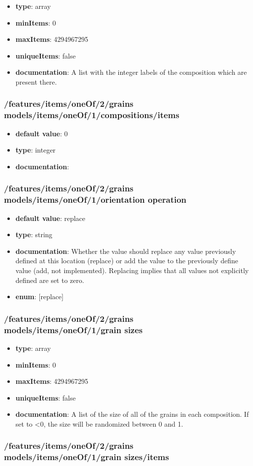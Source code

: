 \begin{itemize}\item {\bf type}: array
\item {\bf minItems}: 0
\item {\bf maxItems}: 4294967295
\item {\bf uniqueItems}: false
\item {\bf documentation}: A list with the integer labels of the composition which are present there.
\end{itemize}\subsubsection{/features/items/oneOf/2/grains models/items/oneOf/1/compositions/items}
\begin{itemize}\item {\bf default value}: 0
\item {\bf type}: integer
\item {\bf documentation}: 
\end{itemize}\subsubsection{/features/items/oneOf/2/grains models/items/oneOf/1/orientation operation}
\begin{itemize}\item {\bf default value}: replace
\item {\bf type}: string
\item {\bf documentation}: Whether the value should replace any value previously defined at this location (replace) or add the value to the previously define value (add, not implemented). Replacing implies that all values not explicitly defined are set to zero.
\item {\bf enum}: [replace]\end{itemize}\subsubsection{/features/items/oneOf/2/grains models/items/oneOf/1/grain sizes}
\begin{itemize}\item {\bf type}: array
\item {\bf minItems}: 0
\item {\bf maxItems}: 4294967295
\item {\bf uniqueItems}: false
\item {\bf documentation}: A list of the size of all of the grains in each composition. If set to <0, the size will be randomized between 0 and 1.
\end{itemize}\subsubsection{/features/items/oneOf/2/grains models/items/oneOf/1/grain sizes/items}
